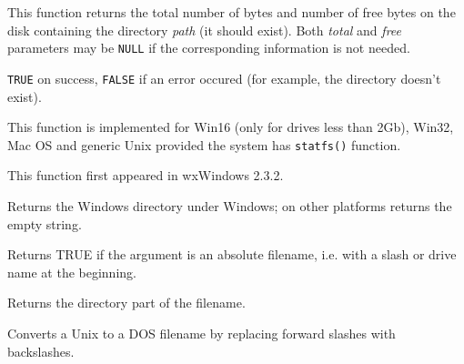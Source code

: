 \label{wxgetdiskspace}


This function returns the total number of bytes and number of free bytes on
the disk containing the directory {\it path} (it should exist). Both
{\it total} and {\it free} parameters may be {\tt NULL} if the corresponding
information is not needed.


{\tt TRUE} on success, {\tt FALSE} if an error occured (for example, the
directory doesn't exist).


This function is implemented for Win16 (only for drives less than 2Gb), Win32,
Mac OS and generic Unix provided the system has {\tt statfs()} function.

This function first appeared in wxWindows 2.3.2.

\label{wxgetosdirectory}


Returns the Windows directory under Windows; on other platforms returns the empty string.

\label{wxisabsolutepath}


Returns TRUE if the argument is an absolute filename, i.e. with a slash
or drive name at the beginning.

\label{wxpathonly}


Returns the directory part of the filename.

\label{wxunix2dosfilename}


Converts a Unix to a DOS filename by replacing forward
slashes with backslashes.

\label{wxconcatfiles}


